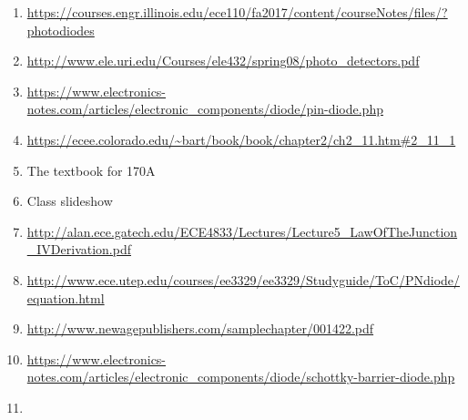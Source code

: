 \begin{enumerate}
	\item \label{ref:packaging_pn_diode} \url{https://courses.engr.illinois.edu/ece110/fa2017/content/courseNotes/files/?photodiodes}
	\item \url{http://www.ele.uri.edu/Courses/ele432/spring08/photo_detectors.pdf}
	\item \url{https://www.electronics-notes.com/articles/electronic_components/diode/pin-diode.php}
	\item \label{ref:thermal_eq} \url{https://ecee.colorado.edu/~bart/book/book/chapter2/ch2_11.htm#2_11_1}
	\item \label{ref:carrier_conc_src} The textbook for 170A
	\item \label{ref:slideshow} Class slideshow
	\item \label{ref:law_of_junction} \url{http://alan.ece.gatech.edu/ECE4833/Lectures/Lecture5_LawOfTheJunction_IVDerivation.pdf}
	\item \label{ref:ideal_diode_src} \url{http://www.ece.utep.edu/courses/ee3329/ee3329/Studyguide/ToC/PNdiode/equation.html}
	\item \label{ref:pn-plot-src} \url{http://www.newagepublishers.com/samplechapter/001422.pdf}
	\item \label{ref:schottky_diode_src}
	\url{https://www.electronics-notes.com/articles/electronic_components/diode/schottky-barrier-diode.php}
	\item \label{ref:zener_reg}
\end{enumerate}
